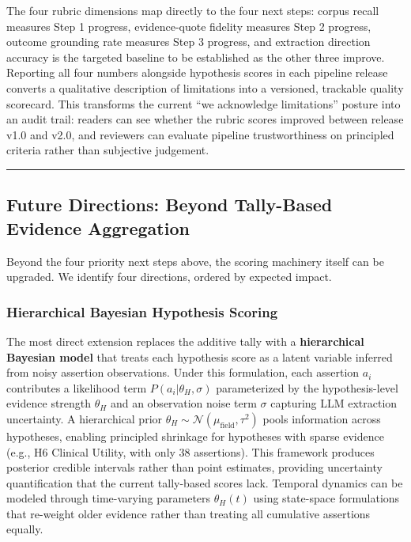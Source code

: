 \documentclass[
  english,
]{article}
\begin{document}
{{{{{{{{{{{{{{{{The four rubric dimensions map directly to the four next steps: corpus
recall measures Step 1 progress, evidence-quote fidelity measures Step 2
progress, outcome grounding rate measures Step 3 progress, and
extraction direction accuracy is the targeted baseline to be established
as the other three improve. Reporting all four numbers alongside
hypothesis scores in each pipeline release converts a qualitative
description of limitations into a versioned, trackable quality
scorecard. This transforms the current ``we acknowledge limitations''
posture into an audit trail: readers can see whether the rubric scores
improved between release v1.0 and v2.0, and reviewers can evaluate
pipeline trustworthiness on principled criteria rather than subjective
judgement.

\begin{center}\rule{0.5\linewidth}{0.5pt}\end{center}

\subsection{Future Directions: Beyond Tally-Based Evidence
Aggregation}\label{future-directions-beyond-tally-based-evidence-aggregation}

Beyond the four priority next steps above, the scoring machinery itself
can be upgraded. We identify four directions, ordered by expected
impact.

\subsubsection{Hierarchical Bayesian Hypothesis
Scoring}\label{hierarchical-bayesian-hypothesis-scoring}

The most direct extension replaces the additive tally with a
\textbf{hierarchical Bayesian model} that treats each hypothesis score
as a latent variable inferred from noisy assertion observations. Under
this formulation, each assertion \(a_i\) contributes a likelihood term
\(P(a_i | \theta_H, \sigma)\) parameterized by the hypothesis-level
evidence strength \(\theta_H\) and an observation noise term \(\sigma\)
capturing LLM extraction uncertainty. A hierarchical prior
\(\theta_H \sim \mathcal{N}(\mu_{\text{field}}, \tau^2)\) pools
information across hypotheses, enabling principled shrinkage for
hypotheses with sparse evidence (e.g., H6 Clinical Utility, with only 38
assertions). This framework produces posterior credible intervals rather
than point estimates, providing uncertainty quantification that the
current tally-based scores lack. Temporal dynamics can be modeled
through time-varying parameters \(\theta_H(t)\) using state-space
formulations that re-weight older evidence rather than treating all
cumulative assertions equally.

}}}}}}}}}}}}}}}}
\end{document}
